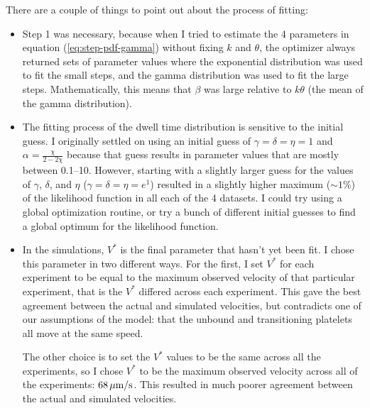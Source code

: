 \documentclass{article}
\newcommand{\tn}{\textnormal}
\begin{document}
There are a couple of things to point out about the process of
fitting:
\begin{itemize}
\item Step 1 was necessary, because when I tried to estimate the 4
  parameters in equation (\ref{eq:step-pdf-gamma}) without fixing $k$
  and $\theta$, the optimizer always returned sets of parameter values
  where the exponential distribution was used to fit the small steps,
  and the gamma distribution was used to fit the large
  steps. Mathematically, this means that $\beta$ was large relative to
  $k \theta$ (the mean of the gamma distribution).
\item The fitting process of the dwell time distribution is sensitive
  to the initial guess. I originally settled on using an initial guess
  of $\gamma = \delta = \eta = 1$ and
  $\alpha = \frac{\chi}{2 - 2\chi}$ because that guess results in
  parameter values that are mostly between 0.1--10. However, starting
  with a slightly larger guess for the values of $\gamma$, $\delta$,
  and $\eta$ ($\gamma = \delta = \eta = e^1$) resulted in a slightly
  higher maximum ($\sim 1\%$) of the likelihood function in all each
  of the 4 datasets. I could try using a global optimization routine,
  or try a bunch of different initial guesses to find a global optimum
  for the likelihood function.
\item In the simulations, $V^*$ is the final parameter that hasn't yet
  been fit. I chose this parameter in two different ways. For the
  first, I set $V^*$ for each experiment to be equal to the maximum
  observed velocity of that particular experiment, that is the $V^*$
  differed across each experiment. This gave the best agreement
  between the actual and simulated velocities, but contradicts one of
  our assumptions of the model: that the unbound and transitioning
  platelets all move at the same speed.

  The other choice is to set the $V^*$ values to be the same across
  all the experiments, so I chose $V^*$ to be the maximum observed
  velocity across all of the experiments: $68 \,\mu
  \tn{m}/\tn{s}$. This resulted in much poorer agreement between the
  actual and simulated velocities.
\end{itemize}
\end{document}
